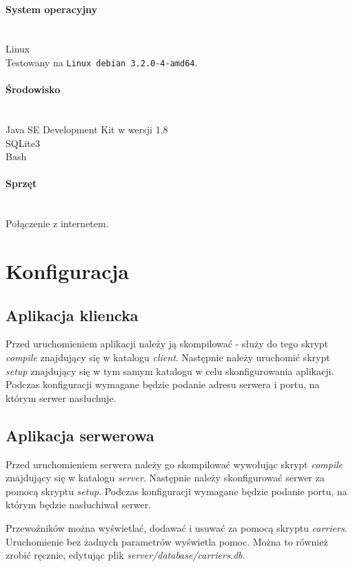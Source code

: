 \documentclass[pdftex,13pt,a4paper]{article}
\begin{document}
\paragraph{System operacyjny}\mbox{}\\
	Linux\\
	Testowany na \texttt{Linux debian 3.2.0-4-amd64}.

\paragraph{Środowisko}\mbox{}\\
	Java SE Development Kit w wersji 1.8\\
	SQLite3\\
	Bash

\paragraph{Sprzęt}\mbox{}\\
	Połączenie z internetem.
	
\section{Konfiguracja}

\subsection{Aplikacja kliencka}

	Przed uruchomieniem aplikacji należy ją skompilować - służy do tego skrypt \emph{compile} znajdujący się w katalogu \emph{client}. Następnie należy uruchomić skrypt \emph{setup} znajdujący się w tym samym katalogu w celu skonfigurowania aplikacji. Podczas konfiguracji wymagane będzie podanie adresu serwera i portu, na którym serwer nasłuchuje.
  
\subsection{Aplikacja serwerowa}

	Przed uruchomieniem serwera należy go skompilować wywołując skrypt \emph{compile} znajdujący się w katalogu \emph{server}. Następnie należy skonfigurować serwer za pomocą skryptu \emph{setup}. Podczas konfiguracji wymagane będzie podanie portu, na którym będzie nasłuchiwał serwer.
	
	Przewoźników można wyświetlać, dodawać i usuwać za pomocą skryptu \emph{carriers}. Uruchomienie bez żadnych parametrów wyświetla pomoc.
Można to również zrobić ręcznie, edytując plik \emph{server/database/carriers.db}.
\end{document}
